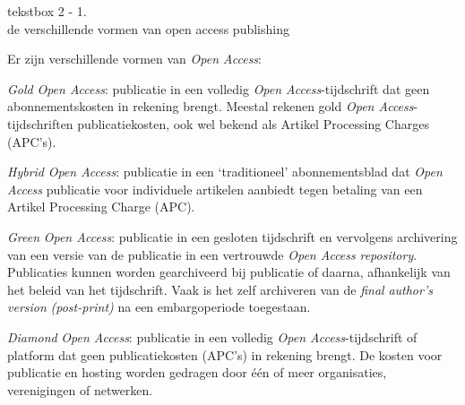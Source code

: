 \documentclass[smallauthor, chapterhaspagenum, nochapterinheader, pagenuminheader,  bigchapnum,medium2, tocpages, garamond, titleinheader]{jote-book}
\begin{document}
	\begin{bookbox}{\raggedright tekstbox 2 - 1. \\de verschillende vormen van open access publishing}
		Er zijn verschillende vormen van \emph{Open Access}:

		\vspace*{\baselineskip}

		\emph{Gold }\emph{Open Access}: publicatie in een volledig \emph{Open Access}-tijdschrift dat geen abonnementskosten in rekening brengt. Meestal rekenen gold \emph{Open Access}-tijdschriften publicatiekosten, ook wel bekend als Artikel Processing Charges (APC's).

		\vspace*{\baselineskip}

		\emph{Hybrid }\emph{Open Access}: publicatie in een ‘traditioneel' abonnementsblad dat \emph{Open Access} publicatie voor individuele artikelen aanbiedt tegen betaling van een Artikel Processing Charge (APC).

		\vspace*{\baselineskip}

		\emph{Green }\emph{Open Access}: publicatie in een gesloten tijdschrift en vervolgens archivering van een versie van de publicatie in een vertrouwde \emph{Open Access} \emph{repository}. Publicaties kunnen worden gearchiveerd bij publicatie of daarna, afhankelijk van het beleid van het tijdschrift. Vaak is het zelf archiveren van de\emph{ }\emph{final}\emph{ }\emph{author's}\emph{ }\emph{version}\emph{ (post-print}\emph{)} na een embargoperiode toegestaan.

		\vspace*{\baselineskip}

		\emph{Diamond}\emph{ }\emph{Open Access}: publicatie in een volledig \emph{Open Access}-tijdschrift of platform dat geen publicatiekosten (APC's) in rekening brengt. De kosten voor publicatie en hosting worden gedragen door één of meer organisaties, verenigingen of netwerken.
	\end{bookbox}
\end{document}
